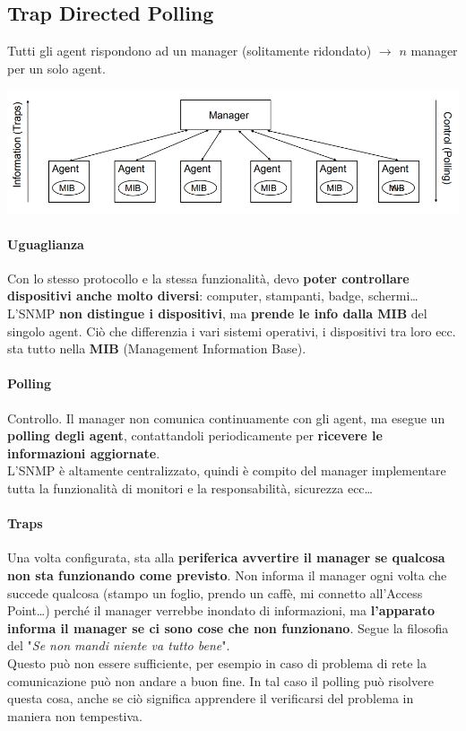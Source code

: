 \documentclass[10pt]{book}
\begin{document}
\subsection{Trap Directed Polling}
Tutti gli agent rispondono ad un manager (solitamente ridondato) $\rightarrow$ $n$ manager per un solo agent.
\begin{center}
	\includegraphics[scale=0.7]{manageragent.png}
\end{center}
\paragraph{Uguaglianza} Con lo stesso protocollo e la stessa funzionalità, devo \textbf{poter controllare dispositivi anche molto diversi}: computer, stampanti, badge, schermi\ldots\\
L'SNMP \textbf{non distingue i dispositivi}, ma \textbf{prende le info dalla MIB} del singolo agent. Ciò che differenzia i vari sistemi operativi, i dispositivi tra loro ecc. sta tutto nella \textbf{MIB} (Management Information Base).
\paragraph{Polling} Controllo. Il manager non comunica continuamente con gli agent, ma esegue un \textbf{polling degli agent}, contattandoli periodicamente per \textbf{ricevere le informazioni aggiornate}.\\
L'SNMP è altamente centralizzato, quindi è compito del manager implementare tutta la funzionalità di monitori e la responsabilità, sicurezza ecc\ldots
\paragraph{Traps} Una volta configurata, sta alla \textbf{periferica avvertire il manager se qualcosa non sta funzionando come previsto}. Non informa il manager ogni volta che succede qualcosa (stampo un foglio, prendo un caffè, mi connetto all'Access Point\ldots) perché il manager verrebbe inondato di informazioni, ma \textbf{l'apparato informa il manager se ci sono cose che non funzionano}. Segue la filosofia del "\textit{Se non mandi niente va tutto bene}".\\
Questo può non essere sufficiente, per esempio in caso di problema di rete la comunicazione può non andare a buon fine. In tal caso il polling può risolvere questa cosa, anche se ciò significa apprendere il verificarsi del problema in maniera non tempestiva.
\end{document}
